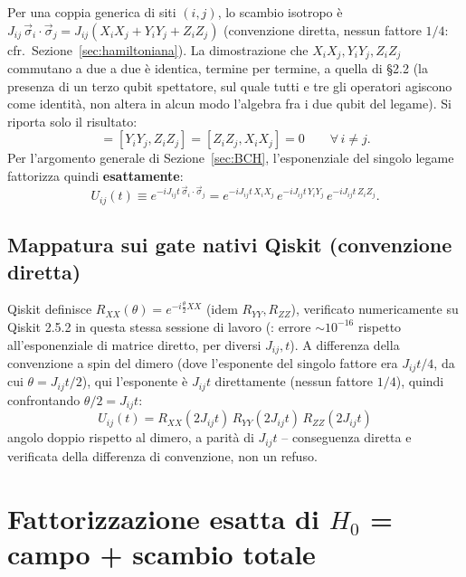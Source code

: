 \documentclass[11pt,a4paper]{article}
\begin{document}
Per una coppia generica di siti $(i,j)$, lo scambio isotropo è $J_{ij}\,\vec\sigma_i\cdot\vec\sigma_j = J_{ij}(X_iX_j+Y_iY_j+Z_iZ_j)$ (convenzione diretta, nessun fattore $1/4$: cfr.\ Sezione~\ref{sec:hamiltoniana}). La dimostrazione che $X_iX_j,Y_iY_j,Z_iZ_j$ commutano a due a due è identica, termine per termine, a quella di \texttt{} \S2.2 (la presenza di un terzo qubit spettatore, sul quale tutti e tre gli operatori agiscono come identità, non altera in alcun modo l'algebra fra i due qubit del legame). Si riporta solo il risultato:
\begin{equation}
[X_iX_j,Y_iY_j]=[Y_iY_j,Z_iZ_j]=[Z_iZ_j,X_iX_j]=0 \qquad \forall\, i\neq j.
\label{eq:XYZ-comm-bond}
\end{equation}
Per l'argomento generale di Sezione~\ref{sec:BCH}, l'esponenziale del singolo legame fattorizza quindi \textbf{esattamente}:
\begin{equation}
U_{ij}(t) \equiv e^{-iJ_{ij}t\,\vec\sigma_i\cdot\vec\sigma_j} = e^{-iJ_{ij}t\,X_iX_j}\,e^{-iJ_{ij}t\,Y_iY_j}\,e^{-iJ_{ij}t\,Z_iZ_j}.
\label{eq:Uij-factor}
\end{equation}

\subsection{Mappatura sui gate nativi Qiskit (convenzione diretta)}
\label{subsec:gate-mapping-ex}

Qiskit definisce $R_{XX}(\theta)=e^{-i\frac\theta2 XX}$ (idem $R_{YY},R_{ZZ}$), verificato numericamente su Qiskit 2.5.2 in questa stessa sessione di lavoro (\texttt{}: errore $\sim10^{-16}$ rispetto all'esponenziale di matrice diretto, per diversi $J_{ij},t$). A differenza della convenzione a spin del dimero (dove l'esponente del singolo fattore era $J_{ij}t/4$, da cui $\theta=J_{ij}t/2$), qui l'esponente è $J_{ij}t$ direttamente (nessun fattore $1/4$), quindi confrontando $\theta/2=J_{ij}t$:
\begin{equation}
\boxed{U_{ij}(t) = R_{XX}(2J_{ij}t)\,R_{YY}(2J_{ij}t)\,R_{ZZ}(2J_{ij}t)}
\label{eq:Uij-gates}
\end{equation}
angolo doppio rispetto al dimero, a parità di $J_{ij}t$ -- conseguenza diretta e verificata della differenza di convenzione, non un refuso.

\section{Fattorizzazione esatta di $H_0$ = campo + scambio totale}
\label{sec:H0-fact}
\end{document}
